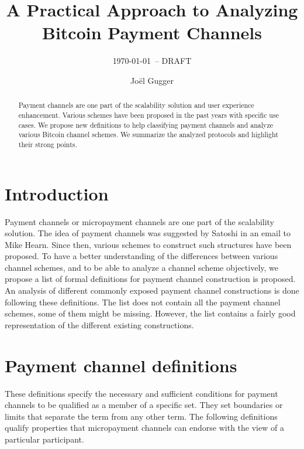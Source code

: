 \documentclass{llncs}
\begin{document}
\title{A Practical Approach to Analyzing Bitcoin Payment Channels}
\author{Jo\"el Gugger}


\subtitle{{\normalsize\today{\small\ -- DRAFT}}}


\maketitle

\begin{abstract} Payment channels are one part of the scalability solution and user experience enhancement. Various schemes have been proposed in the past years with specific use cases. We propose new definitions to help classifying payment channels and analyze various Bitcoin channel schemes. We summarize the analyzed protocols and highlight their strong points.
\end{abstract}

\section{Introduction}
Payment channels or micropayment channels are one part of the scalability solution. The idea of payment channels was suggested by Satoshi in an email to Mike Hearn. Since then, various schemes to construct such structures have been proposed. To have a better understanding of the differences between various channel schemes, and to be able to analyze a channel scheme objectively, we propose a list of formal definitions for payment channel construction is proposed. An analysis of different commonly exposed payment channel constructions is done following these definitions. The list does not contain all the payment channel schemes, some of them might be missing. However, the list contains a fairly good representation of the different existing constructions.

\section{Payment channel definitions}
These definitions specify the necessary and sufficient conditions for payment channels to be qualified as a member of a specific set. They set boundaries or limits that separate the term from any other term. The following definitions qualify properties that micropayment channels can endorse with the view of a particular participant.
\end{document}
